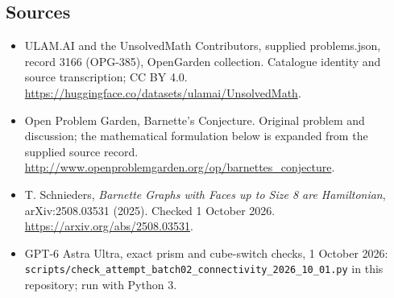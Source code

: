 \documentclass[11pt,a4paper]{article}
\begin{document}
\subsection{Sources}
\begin{itemize}
\item[S1] ULAM.AI and the UnsolvedMath Contributors, supplied problems.json, record 3166 (OPG-385), OpenGarden collection. Catalogue identity and source transcription; CC BY 4.0.
\url{https://huggingface.co/datasets/ulamai/UnsolvedMath}.
\item[S2] Open Problem Garden, Barnette's Conjecture. Original problem and discussion; the mathematical formulation below is expanded from the supplied source record.
\url{http://www.openproblemgarden.org/op/barnettes_conjecture}.
\item[S3] T. Schnieders, \emph{Barnette Graphs with Faces up to Size 8 are Hamiltonian}, arXiv:2508.03531 (2025). Checked 1 October 2026.
\url{https://arxiv.org/abs/2508.03531}.
\item[S4] GPT-6 Astra Ultra, exact prism and cube-switch checks, 1 October 2026: \texttt{scripts/check\_attempt\_batch02\_connectivity\_2026\_10\_01.py} in this repository; run with Python 3.
\end{itemize}
\end{document}
